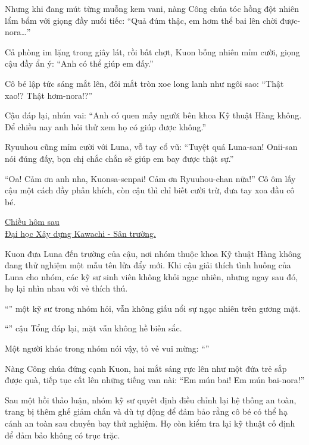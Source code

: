 \documentclass[../main.tex]{subfiles}
\begin{document}
Nhưng khi đang mút từng muỗng kem vani, nàng Công chúa tóc hồng đột nhiên lẩm bẩm với giọng đầy nuối tiếc: ``Quả đúm thậc, em hơm thể bai lên chời được-nora\dots''

Cả phòng im lặng trong giây lát, rồi bất chợt, Kuon bỗng nhiên mỉm cười, giọng cậu đầy ẩn ý: ``Anh có thể giúp em đấy.''

Cô bé lập tức sáng mắt lên, đôi mắt tròn xoe long lanh như ngôi sao: ``Thật xao!? Thật hơm-nora!?''

Cậu đáp lại, nhún vai: ``Anh có quen mấy người bên khoa Kỹ thuật Hàng không. Để chiều nay anh hỏi thử xem họ có giúp được không.''

Ryuuhou cũng mỉm cười với Luna, vỗ tay cổ vũ: ``Tuyệt quá Luna-san! Onii-san nói đúng đấy, bọn chị chắc chắn sẽ giúp em bay được thật sự.''

``Oa! Cảm ơn anh nha, Kuonsa-senpai! Cảm ơn Ryuuhou-chan nữa!'' Cô ôm lấy cậu một cách đầy phấn khích, còn cậu thì chỉ biết cười trừ, đưa tay xoa đầu cô bé.

\ct

\begin{center}
  \uline{Chiều hôm sau\\Đại học Xây dựng Kawachi - Sân trường.}
\end{center}

Kuon đưa Luna đến trường của cậu, nơi nhóm thuộc khoa Kỹ thuật Hàng không đang thử nghiệm một mẫu tên lửa đẩy mới. Khi cậu giải thích tình huống của Luna cho nhóm, các kỹ sư sinh viên không khỏi ngạc nhiên, nhưng ngay sau đó, họ lại nhìn nhau với vẻ thích thú.

``'' một kỹ sư trong nhóm hỏi, vẫn không giấu nổi sự ngạc nhiên trên gương mặt.

``'' cậu Tổng đáp lại, mặt vẫn không hề biến sắc.

Một người khác trong nhóm nói vậy, tỏ vẻ vui mừng: ``''

Nàng Công chúa đứng cạnh Kuon, hai mắt sáng rực lên như một đứa trẻ sắp được quà, tiếp tục cất lên những tiếng van nài: ``Em mún bai! Em mún bai-nora!''

Sau một hồi thảo luận, nhóm kỹ sư quyết định điều chỉnh lại hệ thống an toàn, trang bị thêm ghế giảm chấn và dù tự động để đảm bảo rằng cô bé có thể hạ cánh an toàn sau chuyến bay thử nghiệm. Họ còn kiểm tra lại kỹ thuật cố định để đảm bảo không có trục trặc.
\end{document}
